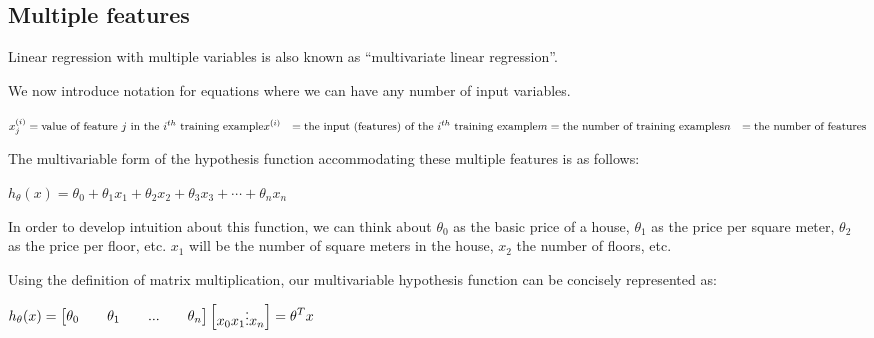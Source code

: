 \documentclass[
]{article}
\begin{document}
\hypertarget{multiple-features}{%
\subsection{Multiple features}\label{multiple-features}}

Linear regression with multiple variables is also known as
``multivariate linear regression''.

We now introduce notation for equations where we can have any number of
input variables.

\(\begin{align*}x_j^{(i)} &= \text{value of feature } j \text{ in the }i^{th}\text{ training example} \newline x^{(i)}& = \text{the input (features) of the }i^{th}\text{ training example} \newline m &= \text{the number of training examples} \newline n &= \text{the number of features} \end{align*}\)

The multivariable form of the hypothesis function accommodating these
multiple features is as follows:

\(h_\theta (x) = \theta_0 + \theta_1 x_1 + \theta_2 x_2 + \theta_3 x_3 + \cdots + \theta_n x_n\)

In order to develop intuition about this function, we can think about
\(\theta_0\) as the basic price of a house, \(\theta_1\) as the price
per square meter, \(\theta_2\) as the price per floor, etc. \(x_1\) will
be the number of square meters in the house, \(x_2\) the number of
floors, etc.

Using the definition of matrix multiplication, our multivariable
hypothesis function can be concisely represented as:

\(\begin{align*}h_\theta(x) =\begin{bmatrix}\theta_0 \hspace{2em} \theta_1 \hspace{2em} ... \hspace{2em} \theta_n\end{bmatrix}\begin{bmatrix}x_0 \newline x_1 \newline \vdots \newline x_n\end{bmatrix}= \theta^T x\end{align*}\)
\end{document}
